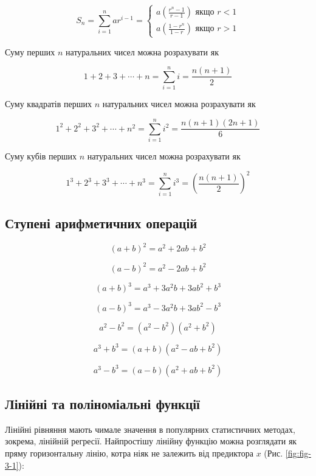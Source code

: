 \documentclass[
  11pt,
]{book}
\begin{document}
\[S_n = \sum\limits_{i=1}^n ar^{i-1} = \begin{cases}
a \left( \frac{r^n - 1}{r-1} \right) \text{ якщо } r<1 \\
a \left( \frac{1-r^n}{1-r} \right) \text{ якщо } r>1
\end{cases}\]

Суму перших \(n\) натуральних чисел можна розрахувати як

\[1+2+3+\cdots + n = \sum\limits_{i=1}^n i = \frac{n(n+1)}{2}\]

Суму квадратів перших \(n\) натуральних чисел можна розрахувати як

\[1^2+2^2+3^2+\cdots + n^2 = \sum\limits_{i=1}^n i^2 = \frac{n(n+1)(2n+1)}{6}\]

Суму кубів перших \(n\) натуральних чисел можна розрахувати як

\[1^3+2^3+3^3+\cdots + n^3 = \sum\limits_{i=1}^n i^3 = \left( \frac{n(n+1)}{2} \right)^2\]

\subsection{Ступені арифметичних операцій}\label{ux441ux442ux443ux43fux435ux43dux456-ux430ux440ux438ux444ux43cux435ux442ux438ux447ux43dux438ux445-ux43eux43fux435ux440ux430ux446ux456ux439}

\[(a+b)^2 = a^2 + 2ab + b^2\]

\[(a-b)^2 = a^2 - 2ab + b^2\]

\[(a+b)^3 = a^3 + 3a^2b + 3ab^2 + b^3\]

\[(a-b)^3 = a^3 - 3a^2b + 3ab^2 - b^3\]

\[a^2 - b^2 = (a^2 - b^2)(a^2 + b^2)\]

\[a^3 + b^3 = (a+b)(a^2 - ab + b^2)\]

\[a^3 - b^3 = (a-b)(a^2 + ab + b^2)\]

\subsection{Лінійні та поліноміальні функції}\label{ux43bux456ux43dux456ux439ux43dux456-ux442ux430-ux43fux43eux43bux456ux43dux43eux43cux456ux430ux43bux44cux43dux456-ux444ux443ux43dux43aux446ux456ux457}

Лінійні рівняння мають чимале значення в популярних статистичних методах, зокрема, лінійній регресії. Найпростішу лінійну функцію можна розглядати як пряму горизонтальну лінію, котра ніяк не залежить від предиктора \(x\) (Рис. \ref{fig:fig-3-1}):
\end{document}
